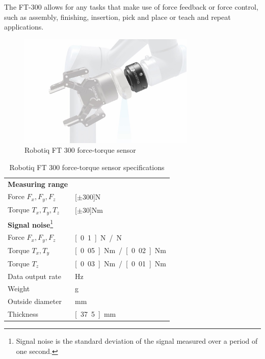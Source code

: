 The FT-300 allows for any tasks that make use of force feedback or force control, such as assembly, finishing, insertion, pick and place or teach and repeat applications.


\begin{figure}
   \centering
   \includegraphics[width=0.75\textwidth]{images/robotiq_ft.jpg}
   \caption{Robotiq FT 300 force-torque sensor}
   \label{pics:robotiq_ft}
\end{figure}

\begin{savenotes}
\begin{table}[h]
\begin{center}
 \caption{Robotiq FT 300 force-torque sensor specifications}\vspace{1ex}
 \label{tab:robotiq_ft}
 \begin{tabular}{ll}
 \hline
 \textbf{Measuring range} & \\
 Force $F_x, F_y, F_z$ & \unit[$\pm 300$]{N} \\
 Torque $T_x, T_y, T_z$ & \unit[$\pm 30$]{Nm} \\ \hline
 \textbf{Signal noise}\footnote{Signal noise is the standard deviation of the signal measured over a period of one second.} &\\
 Force $F_x, F_y, F_z$ & \unit[0.1]{N} / \unit[1]{N} \\
 Torque $T_x, T_y$ & \unit[0.05]{Nm} / \unit[0.02]{Nm} \\
 Torque $T_z$ & \unit[0.03]{Nm} / \unit[0.01]{Nm} \\ \hline
 Data output rate & \unit[100]{Hz} \\
 Weight & \unit[300]{g}\\
 Outside diameter & \unit[75]{mm} \\
 Thickness & \unit[37.5]{mm} \\
 \hline
 \end{tabular}
\end{center}
\end{table}
\end{savenotes}

